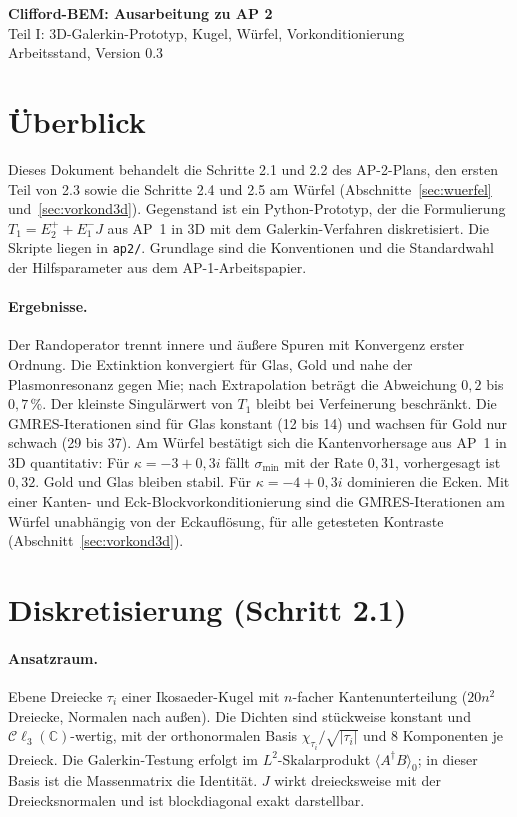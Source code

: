 \documentclass[11pt, a4paper]{article}
\newcommand{\clc}{\mathcal{C}\ell_{3}(\mathbb{C})}
\begin{document}
\begin{center}
  \sffamily
  {\Large\textbf{Clifford-BEM: Ausarbeitung zu AP 2}}\\[0.3cm]
  {\large Teil I: 3D-Galerkin-Prototyp, Kugel, Würfel, Vorkonditionierung}\\[0.3cm]
  {\small Arbeitsstand, Version 0.3}
\end{center}

\section*{Überblick}
Dieses Dokument behandelt die Schritte 2.1 und 2.2 des AP-2-Plans, den ersten Teil
von 2.3 sowie die Schritte 2.4 und 2.5 am Würfel (Abschnitte~\ref{sec:wuerfel}
und~\ref{sec:vorkond3d}). Gegenstand ist ein Python-Prototyp, der die Formulierung
$T_1 = E_2^+ + E_1^-J$ aus AP~1 in 3D mit dem Galerkin-Verfahren diskretisiert.
Die Skripte liegen in \texttt{ap2/}. Grundlage sind die Konventionen und die
Standardwahl der Hilfsparameter aus dem AP-1-Arbeitspapier.

\paragraph{Ergebnisse.} Der Randoperator trennt innere und äußere Spuren mit
Konvergenz erster Ordnung. Die Extinktion konvergiert für Glas, Gold und nahe der
Plasmonresonanz gegen Mie; nach Extrapolation beträgt die Abweichung $0{,}2$ bis
$0{,}7\,\%$. Der kleinste Singulärwert von $T_1$ bleibt bei Verfeinerung beschränkt. Die
GMRES-Iterationen sind für Glas konstant (12 bis 14) und wachsen für Gold nur schwach
(29 bis 37). Am Würfel bestätigt sich die Kantenvorhersage aus AP~1 in 3D quantitativ:
Für $\kappa=-3+0{,}3i$ fällt $\sigma_{\min}$ mit der Rate $0{,}31$, vorhergesagt ist
$0{,}32$. Gold und Glas bleiben stabil. Für $\kappa=-4+0{,}3i$ dominieren die Ecken. Mit einer Kanten- und
Eck-Blockvorkonditionierung sind die GMRES-Iterationen am Würfel unabhängig von der
Eckauflösung, für alle getesteten Kontraste (Abschnitt~\ref{sec:vorkond3d}).

\section{Diskretisierung (Schritt 2.1)}

\paragraph{Ansatzraum.} Ebene Dreiecke $\tau_i$ einer Ikosaeder-Kugel mit $n$-facher
Kantenunterteilung ($20n^2$ Dreiecke, Normalen nach außen). Die Dichten sind
stückweise konstant und $\clc$-wertig, mit der orthonormalen Basis
$\chi_{\tau_i}/\sqrt{|\tau_i|}$ und 8 Komponenten je Dreieck. Die Galerkin-Testung erfolgt
im $L^2$-Skalarprodukt $\langle A^\dagger B\rangle_0$; in dieser Basis ist die
Massenmatrix die Identität. $J$ wirkt dreiecksweise mit der Dreiecksnormalen und ist
blockdiagonal exakt darstellbar.
\end{document}
